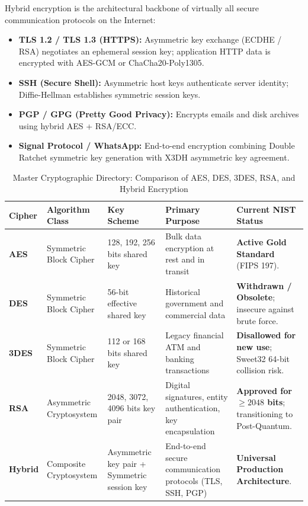 \begin{tcolorbox}[colback=purple!5!white,colframe=purple!60!black,title=\textbf{Real-World Protocols Deploying Hybrid Encryption}]
Hybrid encryption is the architectural backbone of virtually all secure communication protocols on the Internet:
\begin{itemize}
\item \textbf{TLS 1.2 / TLS 1.3 (HTTPS):} Asymmetric key exchange (ECDHE / RSA) negotiates an ephemeral session key; application HTTP data is encrypted with AES-GCM or ChaCha20-Poly1305.
\item \textbf{SSH (Secure Shell):} Asymmetric host keys authenticate server identity; Diffie-Hellman establishes symmetric session keys.
\item \textbf{PGP / GPG (Pretty Good Privacy):} Encrypts emails and disk archives using hybrid AES + RSA/ECC.
\item \textbf{Signal Protocol / WhatsApp:} End-to-end encryption combining Double Ratchet symmetric key generation with X3DH asymmetric key agreement.
\end{itemize}
\end{tcolorbox}

\begin{table}[htbp]
\centering
\caption{Master Cryptographic Directory: Comparison of AES, DES, 3DES, RSA, and Hybrid Encryption}
\label{tab:crypto_comparison_master}
\begin{tabularx}{\textwidth}{p{2.3cm} p{2.2cm} p{2.5cm} X p{3.2cm}}
\toprule
\textbf{Cipher} & \textbf{Algorithm Class} & \textbf{Key Scheme} & \textbf{Primary Purpose} & \textbf{Current NIST Status} \\
\midrule
\textbf{AES} & Symmetric Block Cipher & 128, 192, 256 bits shared key & Bulk data encryption at rest and in transit & \textbf{Active Gold Standard} (FIPS 197). \\
\textbf{DES} & Symmetric Block Cipher & 56-bit effective shared key & Historical government and commercial data & \textbf{Withdrawn / Obsolete}; insecure against brute force. \\
\textbf{3DES} & Symmetric Block Cipher & 112 or 168 bits shared key & Legacy financial ATM and banking transactions & \textbf{Disallowed for new use}; Sweet32 64-bit collision risk. \\
\textbf{RSA} & Asymmetric Cryptosystem & 2048, 3072, 4096 bits key pair & Digital signatures, entity authentication, key encapsulation & \textbf{Approved for $\ge 2048$ bits}; transitioning to Post-Quantum. \\
\textbf{Hybrid} & Composite Cryptosystem & Asymmetric key pair + Symmetric session key & End-to-end secure communication protocols (TLS, SSH, PGP) & \textbf{Universal Production Architecture}. \\
\bottomrule
\end{tabularx}
\end{table}



